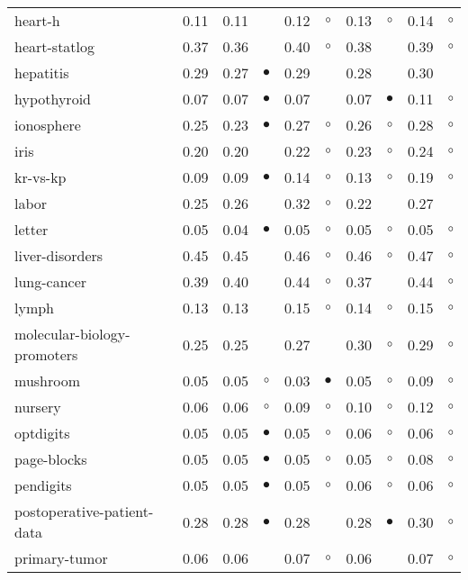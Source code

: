 \begin{table}[thb]
{\begin{tabular}{lrr@{\hspace{0.1cm}}cr@{\hspace{0.1cm}}cr@{\hspace{0.1cm}}cr@{\hspace{0.1cm}}c}
heart-h & 0.11 & 0.11 &           & 0.12 &   $\circ$ & 0.13 &   $\circ$ & 0.14 &  $\circ$\\
heart-statlog & 0.37 & 0.36 &           & 0.40 &   $\circ$ & 0.38 &           & 0.39 &  $\circ$\\
hepatitis & 0.29 & 0.27 & $\bullet$ & 0.29 &           & 0.28 &           & 0.30 &         \\
hypothyroid & 0.07 & 0.07 & $\bullet$ & 0.07 &           & 0.07 & $\bullet$ & 0.11 &  $\circ$\\
ionosphere & 0.25 & 0.23 & $\bullet$ & 0.27 &   $\circ$ & 0.26 &   $\circ$ & 0.28 &  $\circ$\\
iris & 0.20 & 0.20 &           & 0.22 &   $\circ$ & 0.23 &   $\circ$ & 0.24 &  $\circ$\\
kr-vs-kp & 0.09 & 0.09 & $\bullet$ & 0.14 &   $\circ$ & 0.13 &   $\circ$ & 0.19 &  $\circ$\\
labor & 0.25 & 0.26 &           & 0.32 &   $\circ$ & 0.22 &           & 0.27 &         \\
letter & 0.05 & 0.04 & $\bullet$ & 0.05 &   $\circ$ & 0.05 &   $\circ$ & 0.05 &  $\circ$\\
liver-disorders & 0.45 & 0.45 &           & 0.46 &   $\circ$ & 0.46 &   $\circ$ & 0.47 &  $\circ$\\
lung-cancer & 0.39 & 0.40 &           & 0.44 &   $\circ$ & 0.37 &           & 0.44 &  $\circ$\\
lymph & 0.13 & 0.13 &           & 0.15 &   $\circ$ & 0.14 &   $\circ$ & 0.15 &  $\circ$\\
molecular-biology-promoters & 0.25 & 0.25 &           & 0.27 &           & 0.30 &   $\circ$ & 0.29 &  $\circ$\\
mushroom & 0.05 & 0.05 &   $\circ$ & 0.03 & $\bullet$ & 0.05 &   $\circ$ & 0.09 &  $\circ$\\
nursery & 0.06 & 0.06 &   $\circ$ & 0.09 &   $\circ$ & 0.10 &   $\circ$ & 0.12 &  $\circ$\\
optdigits & 0.05 & 0.05 & $\bullet$ & 0.05 &   $\circ$ & 0.06 &   $\circ$ & 0.06 &  $\circ$\\
page-blocks & 0.05 & 0.05 & $\bullet$ & 0.05 &   $\circ$ & 0.05 &   $\circ$ & 0.08 &  $\circ$\\
pendigits & 0.05 & 0.05 & $\bullet$ & 0.05 &   $\circ$ & 0.06 &   $\circ$ & 0.06 &  $\circ$\\
postoperative-patient-data & 0.28 & 0.28 & $\bullet$ & 0.28 &           & 0.28 & $\bullet$ & 0.30 &  $\circ$\\
primary-tumor & 0.06 & 0.06 &           & 0.07 &   $\circ$ & 0.06 &           & 0.07 &  $\circ$\\

\end{tabular}}
\end{table}
